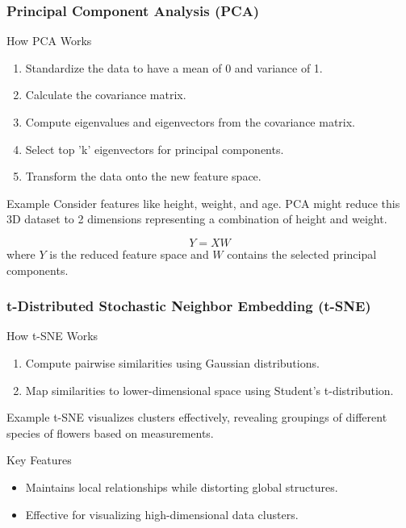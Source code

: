 \documentclass[aspectratio=169]{beamer}
\begin{document}
\begin{frame}[fragile]
    \frametitle{Principal Component Analysis (PCA)}
    \begin{block}{How PCA Works}
        \begin{enumerate}
            \item Standardize the data to have a mean of 0 and variance of 1.
            \item Calculate the covariance matrix.
            \item Compute eigenvalues and eigenvectors from the covariance matrix.
            \item Select top 'k' eigenvectors for principal components.
            \item Transform the data onto the new feature space.
        \end{enumerate}
    \end{block}

    \begin{block}{Example}
        Consider features like height, weight, and age. PCA might reduce this 3D dataset to 2 dimensions representing a combination of height and weight.
    \end{block}
    
    \begin{equation}
        Y = XW 
    \end{equation}
    where \(Y\) is the reduced feature space and \(W\) contains the selected principal components.
\end{frame}

\begin{frame}[fragile]
    \frametitle{t-Distributed Stochastic Neighbor Embedding (t-SNE)}
    \begin{block}{How t-SNE Works}
        \begin{enumerate}
            \item Compute pairwise similarities using Gaussian distributions.
            \item Map similarities to lower-dimensional space using Student’s t-distribution.
        \end{enumerate}
    \end{block}

    \begin{block}{Example}
        t-SNE visualizes clusters effectively, revealing groupings of different species of flowers based on measurements.
    \end{block}

    \begin{block}{Key Features}
        \begin{itemize}
            \item Maintains local relationships while distorting global structures.
            \item Effective for visualizing high-dimensional data clusters.
        \end{itemize}
    \end{block}
\end{frame}
\end{document}

